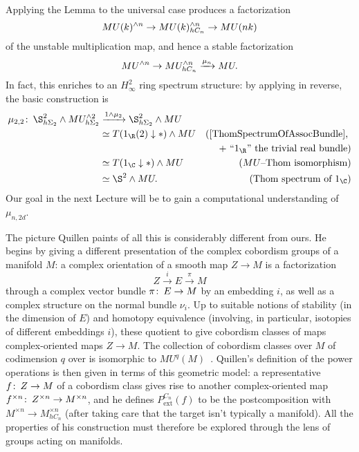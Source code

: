 Applying the Lemma to the universal case produces a factorization \[MU(k)^{\wedge n} \to MU(k)^{\wedge n}_{hC_n} \to MU(nk)\] of the unstable multiplication map, and hence a stable factorization \[MU^{\wedge n} \to MU^{\wedge n}_{hC_n} \xrightarrow{\mu_n} MU.\]  In fact, this enriches to an $H_\infty^2$ ring spectrum structure: by applying  in reverse, the basic construction is
\begin{align*}
\mu_{2,2}\co \S^2_{h\Sigma_2} \sm MU^{\sm 2}_{h\Sigma_2} & \xrightarrow{1 \sm \mu_2} \S^2_{h\Sigma_2} \sm MU \\
& \simeq T(1_{\R}(2) \downarrow *) \sm MU & \text{(\Cref{ThomSpectrumOfAssocBundle}, }\\
& & \text{+ ``$1_{\R}$'' the trivial real bundle)} \\
& \simeq T(1_{\C} \downarrow *) \sm MU & \text{($MU$--Thom isomorphism)} \\
& \simeq \S^2 \sm MU. & \text{(Thom spectrum of $1_{\C}$)}
\end{align*}
Our goal in the next Lecture will be to gain a computational understanding of $\mu_{n,2d}$.

\begin{remark}
The picture Quillen paints of all this is considerably different from ours.  He begins by giving a different presentation of the complex cobordism groups of a manifold $M$: a complex orientation of a smooth map $Z \to M$ is a factorization \[Z \xrightarrow{i} E \xrightarrow{\pi} M\] through a complex vector bundle $\pi\colon\thinspace E \to M$ by an embedding $i$, as well as a complex structure on the normal bundle $\nu_i$.  Up to suitable notions of stability (in the dimension of $E$) and homotopy equivalence (involving, in particular, isotopies of different embeddings $i$), these quotient to give cobordism classes of maps complex-oriented maps $Z \to M$.  The collection of cobordism classes over $M$ of codimension $q$ over is isomorphic to $MU^q(M)$~\cite[Proposition 1.2]{Quillen}.  Quillen's definition of the power operations is then given in terms of this geometric model: a representative $f\colon\thinspace Z \to M$ of a cobordism class gives rise to another complex-oriented map $f^{\times n}\colon\thinspace Z^{\times n} \to M^{\times n}$, and he defines $P^{C_n}_{\mathrm{ext}}(f)$ to be the postcomposition with $M^{\times n} \to M^{\times n}_{hC_n}$ (after taking care that the target isn't typically a manifold).  All the properties of his construction must therefore be explored through the lens of groups acting on manifolds.
\end{remark}

